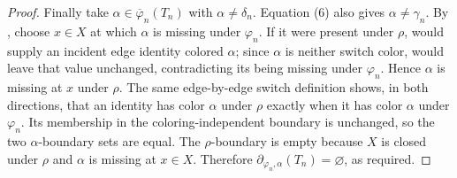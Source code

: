 \begin{proof}
Finally take \(\alpha\in\overline\varphi_n(T_n)\) with
\(\alpha\ne\delta_n\).  Equation (6) also gives
\(\alpha\ne\gamma_n\).  By , choose
\(x\in X\) at which \(\alpha\) is missing under \(\varphi_n\).  If it
were present under \(\rho\),  would supply an
incident edge identity colored \(\alpha\); since \(\alpha\) is neither
switch color,  would leave that value
unchanged, contradicting its being missing under \(\varphi_n\).  Hence
\(\alpha\) is missing at \(x\) under \(\rho\).  The same edge-by-edge
switch definition shows, in both directions, that an identity has color
\(\alpha\) under \(\rho\) exactly when it has color \(\alpha\) under
\(\varphi_n\).  Its membership in the coloring-independent boundary is
unchanged, so the two \(\alpha\)-boundary sets are equal.  The
\(\rho\)-boundary is empty because \(X\) is closed under \(\rho\) and
\(\alpha\) is missing at \(x\in X\).  Therefore
\(\partial_{\varphi_n,\alpha}(T_n)=\varnothing\), as required.
\end{proof}
